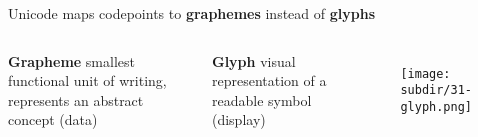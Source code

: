 \documentclass[../index.tex]{subfiles}
\begin{document}
\begin{frame}{\currenttitle}
%
%
%
%
  Unicode maps codepoints to \textbf{graphemes} instead of \textbf{glyphs} \\[1.5em]
  \begin{columns}[t]
    \textbf{Grapheme} \textendash{}
        smallest functional unit of writing, represents an abstract concept (data)

    \textbf{Glyph} \textendash{}
        visual representation of a readable symbol (display) \\[2em]
    \begin{figure}
      \centering
      \texttt{[image: \\subdir/31-glyph.png]}
    \end{figure}
  \end{columns}
\end{frame}
\end{document}

